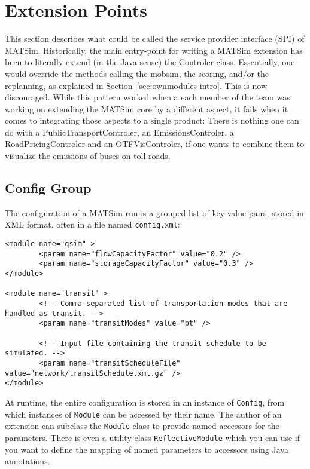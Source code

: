 \section{Extension Points}
This section describes what could be called the service provider interface (SPI) of MATSim.
Historically, the main entry-point for writing a MATSim extension has been to literally extend (in the Java sense)
the Controler class.  Essentially, one would override the methods calling the mobsim, the scoring, and/or the replanning, as explained in Section~\ref{sec:ownmodules-intro}. This is now discouraged. While this pattern worked when a each member of the team
was working on extending the MATSim core by a different aspect, it fails when it comes to
integrating those aspects to a single product: There is nothing one can do with a PublicTransportControler, an EmissionsControler, a RoadPricingControler and an OTFVisControler,
if one wants to combine them to visualize the emissions of buses on toll roads.

\subsection{Config Group}
\label{sec:config}
The configuration of a MATSim run is a grouped list of key-value pairs, stored in XML
format, often in a file named \lstinline$config.xml$:
\begin{lstlisting}
<module name="qsim" >
		<param name="flowCapacityFactor" value="0.2" />
		<param name="storageCapacityFactor" value="0.3" />
</module>

<module name="transit" >
		<!-- Comma-separated list of transportation modes that are handled as transit. -->
		<param name="transitModes" value="pt" />

		<!-- Input file containing the transit schedule to be simulated. -->
		<param name="transitScheduleFile" value="network/transitSchedule.xml.gz" />
</module>
\end{lstlisting}
At runtime, the entire configuration is stored in an instance of \lstinline$Config$, from which instances of \lstinline$Module$ can be accessed by their name.
The author of an extension can subclass the \lstinline$Module$ class to provide named accessors for the parameters.
There is even a utility class \lstinline$ReflectiveModule$ which you can use if you want to define the mapping of named parameters to accessors
using Java annotations.

